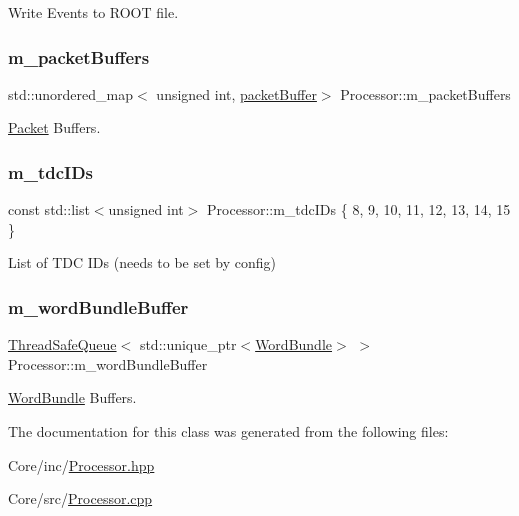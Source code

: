 Write Events to R\+O\+OT file. 

\mbox{\label{class_processor_ab75c789ec03e38e8621f000332daa285}} 
\subsubsection{\texorpdfstring{m\+\_\+packet\+Buffers}{m\_packetBuffers}}
{\footnotesize\ttfamily std\+::unordered\+\_\+map$<$ unsigned int, \hyperlink{class_processor_a0cfd8ed0721769db91c142a19a392e0f}{packet\+Buffer}$>$ Processor\+::m\+\_\+packet\+Buffers\hspace{0.3cm}{\ttfamily [private]}}



\hyperlink{class_packet}{Packet} Buffers. 

\mbox{\label{class_processor_a8eaa993665bf2a2ed71f84ffc0630574}} 
\subsubsection{\texorpdfstring{m\+\_\+tdc\+I\+Ds}{m\_tdcIDs}}
{\footnotesize\ttfamily const std\+::list$<$unsigned int$>$ Processor\+::m\+\_\+tdc\+I\+Ds \{ 8, 9, 10, 11, 12, 13, 14, 15 \}\hspace{0.3cm}{\ttfamily [private]}}



List of T\+DC I\+Ds (needs to be set by config) 

\mbox{\label{class_processor_a1ec54aa38a8c50dc77877e17feed6142}} 
\subsubsection{\texorpdfstring{m\+\_\+word\+Bundle\+Buffer}{m\_wordBundleBuffer}}
{\footnotesize\ttfamily \hyperlink{class_thread_safe_queue}{Thread\+Safe\+Queue}$<$ std\+::unique\+\_\+ptr$<$\hyperlink{class_word_bundle}{Word\+Bundle}$>$ $>$ Processor\+::m\+\_\+word\+Bundle\+Buffer\hspace{0.3cm}{\ttfamily [private]}}



\hyperlink{class_word_bundle}{Word\+Bundle} Buffers. 



The documentation for this class was generated from the following files\+:\begin{DoxyCompactItemize}
\item 
Core/inc/\hyperlink{_processor_8hpp}{Processor.\+hpp}\item 
Core/src/\hyperlink{_processor_8cpp}{Processor.\+cpp}\end{DoxyCompactItemize}
